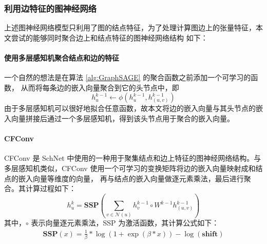 \subsubsection{利用边特征的图神经网络}
上述图神经网络模型只利用了图的结点特征，为了处理计算图边上的张量特征，本文尝试的能够同时聚合边上和结点特征的图神经网络结构\cite{EdgeGNN} 如下：

\paragraph{使用多层感知机聚合结点和边的特征\cite{MLPEdgeGNN}}

一个自然的想法是在算法 \ref{alg:GraphSAGE} 的聚合函数之前添加一个可学习的函数，
从而将每条边的嵌入向量聚合到它的头节点中，即
\begin{equation}
    h_{u}^{k-1} \leftarrow \phi(h_u^{k-1}, h_{(u,v)}^{k-1})
\end{equation}
由于多层感知机\cite{MLP}可以很好地拟合任意函数，故本文将边的嵌入向量与其头节点的嵌入向量拼接后通过一个多层感知机，得到该头节点用于聚合的嵌入向量。

\paragraph{CFConv \cite{SchNet}}

CFConv 是 SchNet \cite{SchNet} 中使用的一种用于聚集结点和边上特征的图神经网络结构。与多层感知机类似，CFConv 使用一个可学习的变换矩阵将边的嵌入向量映射成和结点的嵌入向量等维度的向量，
再与结点的嵌入向量做逐元素乘法，最后进行聚合。其计算过程如下：
\begin{equation}
    h_u^{k} = \mathbf{SSP}(\sum \limits_{v \in \mathcal{N}(u)} h_v^{k-1} \circ W^{k-1} h^{k-1}_{(u,v)})
\end{equation}
其中，$\circ$ 表示向量逐元素乘法，SSP 为激活函数，其计算公式如下：
\begin{align}
    \mathbf{SSP}(x) = \frac{1}{\beta} * \log(1 + \exp(\beta * x)) - \log(\mathbf{shift})
\end{align}
